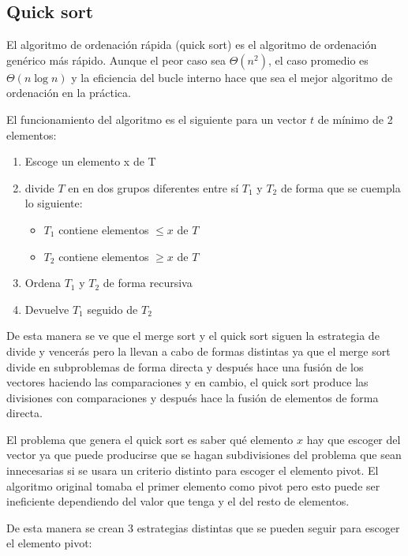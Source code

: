 \subsection{Quick sort}

El algoritmo de ordenación rápida (quick sort) es el algoritmo de ordenación
genérico más rápido. Aunque el peor caso sea $\Theta(n^2)$, el caso promedio es
$\Theta(n\log  n)$ y la eficiencia del bucle interno hace que sea el mejor
algoritmo de ordenación en la práctica.

El funcionamiento del algoritmo es el siguiente para un vector $t$ de mínimo de
2 elementos:

\begin{enumerate}
    \item Escoge un elemento x de T
    \item divide $T$ en en dos grupos diferentes entre sí $T_1$ y $T_2$ de
        forma que se cuempla lo siguiente:
        \begin{itemize}
            \item $T_1$ contiene elementos $\leq x$ de $T$
            \item $T_2$ contiene elementos $\geq x$ de $T$
        \end{itemize}
    \item Ordena $T_1$ y $T_2$ de forma recursiva
    \item Devuelve $T_1$ seguido de $T_2$
\end{enumerate}

De esta manera se ve que el merge sort y el quick sort siguen la estrategia de
divide y vencerás pero la llevan a cabo de formas distintas ya que el merge
sort divide en subproblemas de forma directa y después hace una fusión de los
vectores haciendo las comparaciones y en cambio, el quick sort produce las
divisiones con comparaciones y después hace la fusión de elementos de forma
directa.

El problema que genera el quick sort es saber qué elemento $x$ hay que escoger
del vector ya que puede producirse que se hagan subdivisiones del problema que
sean innecesarias si se usara un criterio distinto para escoger el elemento
pivot. El algoritmo original tomaba el primer elemento como pivot pero esto
puede ser ineficiente dependiendo del valor que tenga y el del resto de
elementos.

De esta manera se crean 3 estrategias distintas que se pueden seguir para
escoger el elemento pivot:

